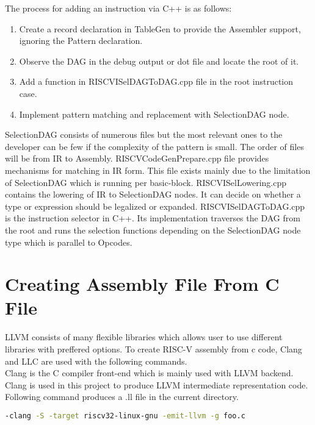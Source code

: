 The process for adding an instruction via C++ is as follows:
\begin{enumerate}
    \item Create a record declaration in TableGen to provide the Assembler support, ignoring the Pattern declaration.
    \item Observe the DAG in the debug output or dot file and locate the root of it. 
    \item Add a function in RISCVISelDAGToDAG.cpp file in the root instruction case. 
    \item Implement pattern matching and replacement with SelectionDAG node.
\end{enumerate}

SelectionDAG consists of numerous files but the most relevant ones to the developer can be few if the complexity of the pattern is small. The order of files will be from IR to Assembly. RISCVCodeGenPrepare.cpp file provides mechanisms for matching in IR form. This file exists mainly due to the limitation of SelectionDAG which is running per basic-block. RISCVISelLowering.cpp contains the lowering of IR to SelectionDAG nodes. It can decide on whether a type or expression should be legalized or expanded. RISCVISelDAGToDAG.cpp is the instruction selector in C++. Its implementation traverses the DAG from the root and runs the selection functions depending on the SelectionDAG node type which is parallel to Opcodes. 





\section{Creating Assembly File From C File}

LLVM consists of many flexible libraries which allows user to use different libraries with preffered  options. To create RISC-V assembly from c code, Clang and LLC are used with the following commands. \\

Clang is the C compiler front-end which is mainly used with LLVM backend. Clang is used in this project to produce LLVM intermediate representation code. Following command produces a .ll file in the current directory. 

\begin{lstlisting}[language=Bash]
-clang -S -target riscv32-linux-gnu -emit-llvm -g foo.c
\end{lstlisting}

